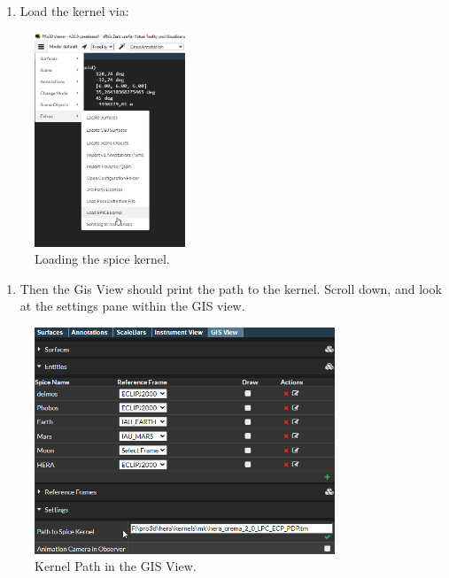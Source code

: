 \begin{enumerate}
	\def\labelenumi{\arabic{enumi}.}
	\setcounter{enumi}{1}
	\tightlist
	\item
	Load the kernel via:
\end{enumerate}

\begin{figure}[h!]
	\centering
	\includegraphics[width=0.4\textwidth]{pics/loadKernel.png}
	\caption{Loading the spice kernel.}
\end{figure}



\begin{enumerate}
	\def\labelenumi{\arabic{enumi}.}
	\setcounter{enumi}{2}
	\tightlist
	\item
	Then the Gis View should print the path to the kernel. Scroll down,
	and look at the settings pane within the GIS view.
\end{enumerate}

\begin{figure}[h!]
	\centering
	\includegraphics[width=0.8\textwidth]{pics/loadedKernel.png}
	\caption{Kernel Path in the GIS View.}
\end{figure}

